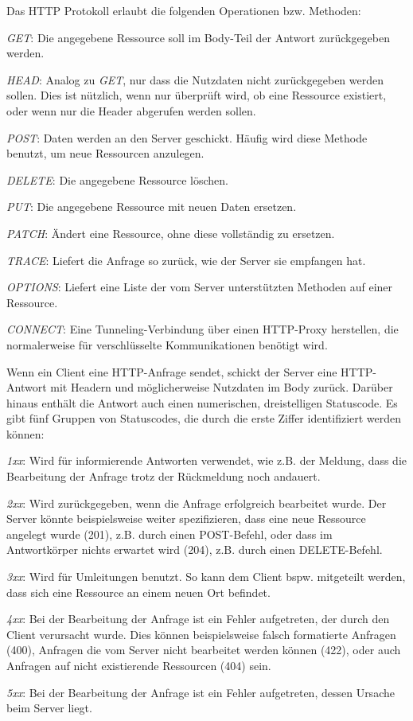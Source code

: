 Das HTTP Protokoll erlaubt die folgenden Operationen bzw. Methoden:

\begin{description}
	\item \emph{GET}: Die angegebene Ressource soll im Body-Teil der Antwort zurückgegeben werden.
	\item \emph{HEAD}: Analog zu \emph{GET}, nur dass die Nutzdaten nicht zurückgegeben werden sollen. Dies ist nützlich, wenn nur überprüft wird, ob eine Ressource existiert, oder wenn nur die Header abgerufen werden sollen.
	\item \emph{POST}: Daten werden an den Server geschickt. Häufig wird diese Methode benutzt, um neue Ressourcen anzulegen.
	\item \emph{DELETE}: Die angegebene Ressource löschen.
	\item \emph{PUT}: Die angegebene Ressource mit neuen Daten ersetzen.
	\item \emph{PATCH}: Ändert eine Ressource, ohne diese vollständig zu ersetzen.
	\item \emph{TRACE}: Liefert die Anfrage so zurück, wie der Server sie empfangen hat.
	\item \emph{OPTIONS}: Liefert eine Liste der vom Server unterstützten Methoden auf einer Ressource.
	\item \emph{CONNECT}: Eine Tunneling-Verbindung über einen HTTP-Proxy herstellen, die normalerweise für verschlüsselte Kommunikationen benötigt wird.
\end{description}

Wenn ein Client eine HTTP-Anfrage sendet, schickt der Server eine HTTP-Antwort mit Headern und möglicherweise Nutzdaten im Body zurück. Darüber hinaus enthält die Antwort auch einen numerischen, dreistelligen Statuscode. Es gibt fünf Gruppen von Statuscodes, die durch die erste Ziffer identifiziert werden können:

\begin{description}
	\item \emph{1xx}: Wird für informierende Antworten verwendet, wie z.B. der Meldung, dass die Bearbeitung der Anfrage trotz der Rückmeldung noch andauert.
	\item \emph{2xx}: Wird zurückgegeben, wenn die Anfrage erfolgreich bearbeitet wurde. Der Server könnte beispielsweise weiter spezifizieren, dass eine neue Ressource angelegt wurde (201), z.B. durch einen POST-Befehl, oder dass im Antwortkörper nichts erwartet wird (204), z.B. durch einen DELETE-Befehl.
	\item \emph{3xx}: Wird für Umleitungen benutzt. So kann dem Client bspw. mitgeteilt werden, dass sich eine Ressource an einem neuen Ort befindet.
	\item \emph{4xx}: Bei der Bearbeitung der Anfrage ist ein Fehler aufgetreten, der durch den Client verursacht wurde. Dies können beispielsweise falsch formatierte Anfragen (400), Anfragen die vom Server nicht bearbeitet werden können (422), oder auch Anfragen auf nicht existierende Ressourcen (404) sein.
	\item \emph{5xx}: Bei der Bearbeitung der Anfrage ist ein Fehler aufgetreten, dessen Ursache beim Server liegt. 
\end{description}


